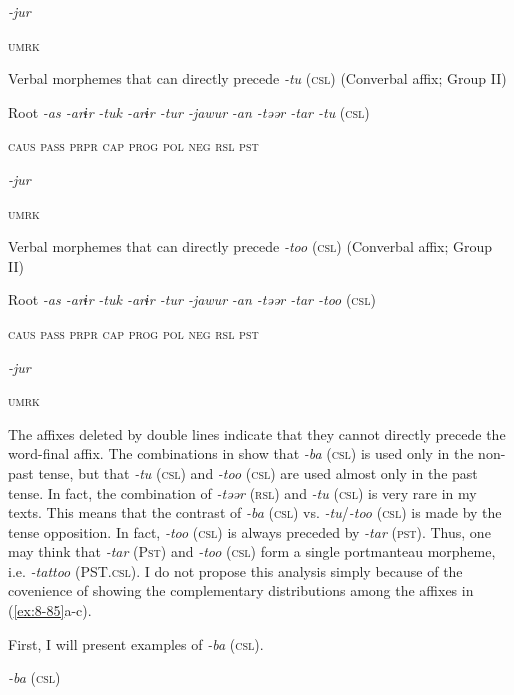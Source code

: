           \textit{-jur}

          \textsc{umrk}


\ex Verbal morphemes that can directly precede \textit{-tu} (\textsc{csl}) (Converbal affix; Group II)

  Root  \textit{-as  -arɨr} %
\textit{-tuk  -arɨr  -tur  -jawur} %
\textit{-an  -təər  -tar  -tu} (\textsc{csl})

    \textsc{caus}  \textsc{pass}  \textsc{prpr}  \textsc{cap}  \textsc{prog}  \textsc{pol}  \textsc{neg}  \textsc{rsl}  \textsc{pst}

          \textit{-jur}

          \textsc{umrk}

\ex Verbal morphemes that can directly precede \textit{-too} (\textsc{csl}) (Converbal affix; Group II)

  Root  \textit{-as  -arɨr} %
\textit{-tuk  -arɨr  -tur  -jawur} %
\textit{-an  -təər  -tar  -too} (\textsc{csl})

    \textsc{caus}  \textsc{pass}  \textsc{prpr}  \textsc{cap}  \textsc{prog}  \textsc{pol}  \textsc{neg}  \textsc{rsl}  \textsc{pst}

          \textit{-jur}

          \textsc{umrk}
\z
\z

The affixes deleted by double lines indicate that they cannot directly precede the word-final affix. The combinations in  show that \textit{-ba} (\textsc{csl}) is used only in the non-past tense, but that \textit{-tu} (\textsc{csl}) and \textit{-too} (\textsc{csl}) are used almost only in the past tense. In fact, the combination of \textit{-təər} (\textsc{rsl}) and \textit{-tu} (\textsc{csl}) is very rare in my texts. This means that the contrast of \textit{-ba} (\textsc{csl}) vs. \textit{-tu}/\textit{-too} (\textsc{csl}) is made by the tense opposition. In fact, \textit{-too} (\textsc{csl}) is always preceded by \textit{-tar} (\textsc{pst}). Thus, one may think that \textit{-tar} (P\textsc{st}) and \textit{-too} (\textsc{csl}) form a single portmanteau morpheme, i.e. \textit{-tattoo} (PST.\textsc{csl}). I do not propose this analysis simply because of the covenience of showing the complementary distributions among the affixes in (\ref{ex:8-85}a-c).

  First, I will present examples of \textit{-ba} (\textsc{csl}).

\ea\label{ex:8-86}
  \textit{-ba} (\textsc{csl})

